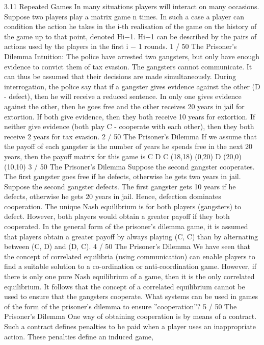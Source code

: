 \documentclass[]{report}
\begin{document}
3.11 Repeated Games
In many situations players will interact on many occasions.
Suppose two players play a matrix game n times.
In such a case a player can condition the action he takes in the i-th
realisation of the game on the history of the game up to that
point, denoted Hi−1.
Hi−1 can be described by the pairs of actions used by the players in
the first i − 1 rounds.
1 / 50
The Prisoner’s Dilemma
Intuition: The police have arrested two gangsters, but only have
enough evidence to convict them of tax evasion. The gangsters
cannot communicate. It can thus be assumed that their decisions
are made simultaneously.
During interrogation, the police say that if a gangster gives
evidence against the other (D - defect), then he will receive a
reduced sentence.
In only one gives evidence against the other, then he goes free and
the other receives 20 years in jail for extortion.
If both give evidence, then they both receive 10 years for extortion.
If neither give evidence (both play C - cooperate with each other),
then they both receive 2 years for tax evasion.
2 / 50
The Prisoner’s Dilemma
If we assume that the payoff of each gangster is the number of
years he spends free in the next 20 years, then the payoff matrix
for this game is
C D
C (18,18) (0,20)
D (20,0) (10,10)
3 / 50
The Prisoner’s Dilemma
Suppose the second gangster cooperates. The first gangster goes
free if he defects, otherwise he gets two years in jail.
Suppose the second gangster defects. The first gangster gets 10
years if he defects, otherwise he gets 20 years in jail.
Hence, defection dominates cooperation. The unique Nash
equilibrium is for both players (gangsters) to defect.
However, both players would obtain a greater payoff if they both
cooperated.
In the general form of the prisoner’s dilemma game, it is assumed
that players obtain a greater payoff by always playing (C, C) than
by alternating between (C, D) and (D, C).
4 / 50
The Prisoner’s Dilemma
We have seen that the concept of correlated equilibria (using
communication) can enable players to find a suitable solution to a
co-ordination or anti-coordination game.
However, if there is only one pure Nash equilibrium of a game,
then it is the only correlated equilibrium.
It follows that the concept of a correlated equilibrium cannot be
used to ensure that the gangsters cooperate.
What systems can be used in games of the form of the prisoner’s
dilemma to ensure ”cooperation”?
5 / 50
The Prisoner’s Dilemma
One way of obtaining cooperation is by means of a contract.
Such a contract defines penalties to be paid when a player uses an
inappropriate action. These penalties define an induced game,
\end{document}
